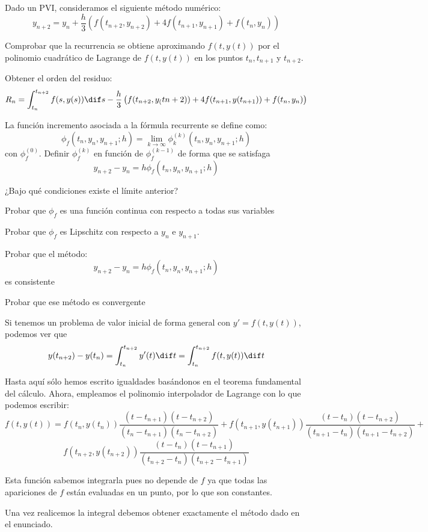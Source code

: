 \begin{problem}[4]
Dado un PVI, consideramos el siguiente método numérico:
\[y_{n+2}=y_n+\frac{h}{3}\left(f(t_{n+2},y_{n+2})+4f(t_{n+1},y_{n+1}) + f(t_n,y_n) \right)\]

\ppart Comprobar que la recurrencia se obtiene aproximando $f(t,y(t))$ por el polinomio cuadrático de Lagrange de $f(t,y(t))$ en los puntos $t_n,t_{n+1}$ y $t_{n+2}$.

\ppart Obtener el orden del residuo:
\[R_n = \int_{t_n}^{t_{n+2}}f(s,y(s))\dif s -\frac{h}{3}\left(f(t_{n+2},y_(t{n+2}))+4f(t_{n+1},y(t_{n+1})) + f(t_n,y_n) \right)\]

\ppart La función incremento asociada a la fórmula recurrente se define como:
\[\phi_f(t_n,y_n,y_{n+1};h) = \lim_{k\to \infty}\phi_k^{(k)}(t_n,y_n,y_{n+1};h)\]
con $\phi_f^{(0)}$. Definir $\phi_f^{(k)}$ en función de $\phi_f^{(k-1)}$ de forma que se satisfaga
\[y_{n+2}-y_n = h \phi_f(t_n,y_n,y_{n+1};h) \]

¿Bajo qué condiciones existe el límite anterior?

\ppart Probar que $\phi_f$ es una función continua con respecto a todas sus variables

\ppart Probar que $\phi_f$ es Lipschitz con respecto a $y_n$ e $y_{n+1}$.

\ppart Probar que el método:
\[y_{n+2}-y_n = h \phi_f(t_n,y_n,y_{n+1};h) \]
es consistente

\ppart Probar que ese método es convergente
\solution

\spart

Si tenemos un problema de valor inicial de forma general con $y'=f(t,y(t))$, podemos ver que
\[y(t_{n+2}) - y(t_n) = \int_{t_n}^{t_{n+2}}y'(t)\dif t =\int_{t_n}^{t_{n+2}}f(t,y(t))\dif t \]

Hasta aquí sólo hemos escrito igualdades basándonos en el teorema fundamental del cálculo. Ahora, empleamos el polinomio interpolador de Lagrange con lo que podemos escribir:
\[f(t,y(t))=f(t_n,y(t_n))\frac{(t-t_{n+1})(t-t_{n+2})}{(t_n-t_{n+1})(t_n-t_{n+2})} + f(t_{n+1},y(t_{n+1}))\frac{(t-t_n)(t-t_{n+2})}{(t_{n+1}-t_n)(t_{n+1}-t_{n+2})} +\]
\[f(t_{n+2},y(t_{n+2})) \frac{(t-t_n)(t-t_{n+1})}{(t_{n+2}-t_n)(t_{n+2}-t_{n+1})}\]

Esta función sabemos integrarla pues no depende de $f$ ya que todas las apariciones de $f$ están evaluadas en un punto, por lo que son constantes.

Una vez realicemos la integral debemos obtener exactamente el método dado en el enunciado.


\end{problem}
